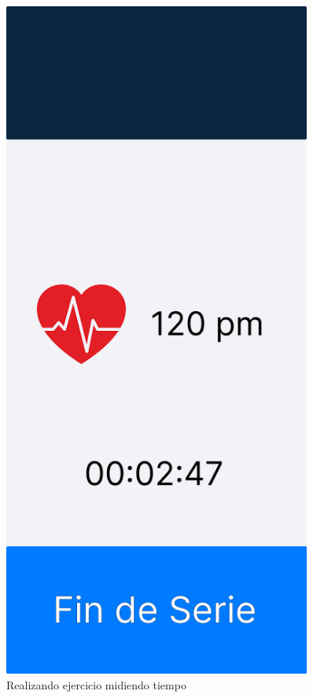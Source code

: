 \begin{figure}[H]
   \centering
   \begin{minipage}{0.45\textwidth}
      \centering
      \includegraphics[width=0.9\textwidth]{fotos/Frame 60.png}
      \caption{Realizando ejercicio midiendo tiempo}

\end{minipage}
\end{figure}
